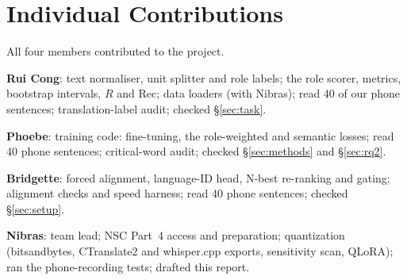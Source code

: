 \section*{Individual Contributions}
All four members contributed to the project.

\noindent\textbf{Rui Cong}: text normaliser, unit splitter and role labels; the role scorer, metrics, bootstrap intervals, $R$ and Rec; data loaders (with Nibras); read 40 of our phone sentences; translation-label audit; checked \S\ref{sec:task}.

\noindent\textbf{Phoebe}: training code: fine-tuning, the role-weighted and semantic losses; read 40 phone sentences; critical-word audit; checked \S\ref{sec:methods} and \S\ref{sec:rq2}.

\noindent\textbf{Bridgette}: forced alignment, language-ID head, N-best re-ranking and gating; alignment checks and speed harness; read 40 phone sentences; checked \S\ref{sec:setup}.

\noindent\textbf{Nibras}: team lead; NSC Part~4 access and preparation; quantization (bitsandbytes, CTranslate2 and whisper.cpp exports, sensitivity scan, QLoRA); ran the phone-recording tests; drafted this report.
